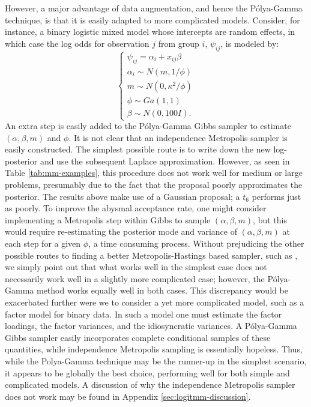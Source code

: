 \documentclass[11pt]{article}
\newcommand{\Polya}{P\'{o}lya}
\begin{document}
However, a major advantage of data augmentation, and hence the \Polya-Gamma
technique, is that it is easily adapted to more complicated models.  Consider,
for instance, a binary logistic mixed model whose intercepts are random effects,
in which case the log odds for observation $j$ from group $i$, $\psi_{ij}$, is
modeled by:
\begin{equation}
\label{eqn:mixed-model}
\begin{cases}
\psi_{ij} = \alpha_i + x_{ij} \beta \\
\alpha_i \sim N(m, 1/\phi) \\
m \sim N(0, \kappa^2 / \phi) \\
\phi \sim Ga(1,1) \\
\beta \sim N(0, 100 I).
\end{cases}
\end{equation}
An extra step is easily added to the \Polya-Gamma Gibbs sampler to estimate
$(\alpha, \beta, m)$ and $\phi$.  It is not clear that an independence
Metropolis sampler is easily constructed.  The simplest possible route is to
write down the new log-posterior and use the subsequent Laplace approximation.
However, as seen in Table \ref{tab:mm-examples}, this procedure does not work
well for medium or large problems, presumably due to the fact that the proposal
poorly approximates the posterior.  The results above make use of a Gaussian
proposal; a $t_6$ performs just as poorly.  To improve the abysmal acceptance
rate, one might consider implementing a Metropolis step within Gibbs to sample
$(\alpha,\beta,m)$, but this would require re-estimating the posterior mode and
variance of $(\alpha,\beta,m)$ at each step for a given $\phi$, a time consuming
process.  Without prejudicing the other possible routes to finding a better
Metropolis-Hastings based sampler, such as \cite{gamerman-1997}, we simply point
out that what works well in the simplest case does not necessarily work well in
a slightly more complicated case; however, the \Polya-Gamma method works equally
well in both cases.  This discrepancy would be exacerbated further were we to
consider a yet more complicated model, such as a factor model for binary data.
In such a model one must estimate the factor loadings, the factor variances, and
the idiosyncratic variances.  A \Polya-Gamma Gibbs sampler easily incorporates
complete conditional samples of these quantities, while independence Metropolis
sampling is essentially hopeless.  Thus, while the Polya-Gamma technique may be
the runner-up in the simplest scenario, it appears to be globally the best
choice, performing well for both simple and complicated models.  A discussion of
why the independence Metropolis sampler does not work may be found in Appendix
\ref{sec:logitmm-discussion}.
\end{document}
